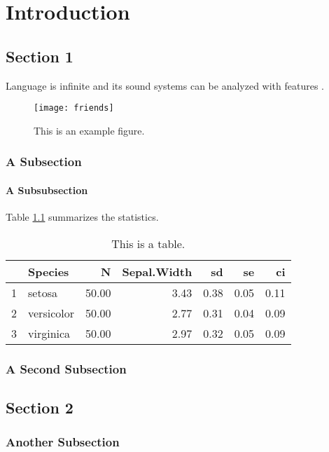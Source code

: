 \chapter{Introduction}
\section{Section 1}
Language is infinite \citep{yang2006infinite} and its sound systems can be analyzed with features \citep{chomsky1968sound}. \lipsum[1]

\begin{figure}[ht]
    \centering
    \texttt{[image: friends]}
    \caption{This is an example figure.}
    \label{fig:friends}
\end{figure}

\subsection{A Subsection}
\lipsum[2]
\subsubsection{A Subsubsection}
Table \ref{tbl:sepalwidth} summarizes the statistics. \lipsum[22] 

\begin{table}[ht]
\centering
\begin{tabular}{rlrrrrr}
  \hline
 & Species & N & Sepal.Width & sd & se & ci \\ 
  \hline
1 & setosa & 50.00 & 3.43 & 0.38 & 0.05 & 0.11 \\ 
  2 & versicolor & 50.00 & 2.77 & 0.31 & 0.04 & 0.09 \\ 
  3 & virginica & 50.00 & 2.97 & 0.32 & 0.05 & 0.09 \\ 
   \hline
\end{tabular}
\caption{This is a table.}
\label{tbl:sepalwidth}
\end{table}

\subsection{A Second Subsection}
\lipsum[3]
\section{Section 2}
\lipsum[4]
\subsection{Another Subsection}
\lipsum[5-7]


